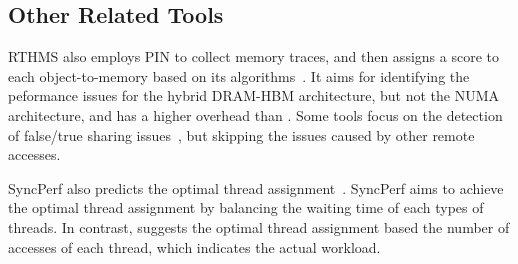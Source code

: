 



\subsection{Other Related Tools}
RTHMS also employs PIN to collect memory traces, and then assigns a score to each object-to-memory based on its algorithms~\cite{RTHMS}. It aims for identifying the peformance issues for the hybrid DRAM-HBM architecture, but not the NUMA architecture, and has a higher overhead than \NP{}. Some tools focus on the detection of false/true sharing issues~\cite{Predator, Cheetah, DBLP:conf/ppopp/ChabbiWL18, helm2019perfmemplus}, but skipping the issues caused by other remote accesses. 

SyncPerf also predicts the optimal thread assignment~\cite{SyncPerf}. SyncPerf aims to achieve the optimal thread assignment by balancing the waiting time of each types of threads. In contrast, \NP{} suggests the optimal thread assignment based  the number of accesses of each thread, which indicates the actual workload. 





